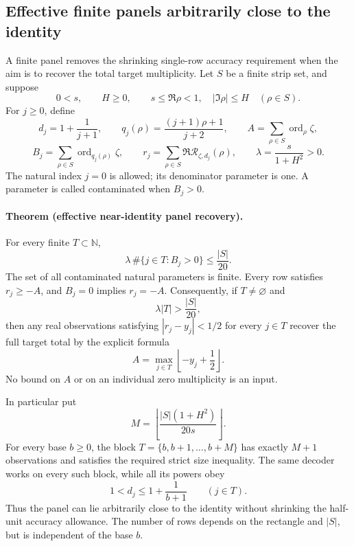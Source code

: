 \subsection{Effective finite panels arbitrarily close to the identity}
\label{sec:near-identity-panel}

A finite panel removes the shrinking single-row accuracy requirement when
the aim is to recover the total target multiplicity. Let \(S\) be a finite
strip set, and suppose
\[
 0<s,\qquad H\ge0,\qquad
 s\le\Re\rho<1,\quad |\Im\rho|\le H\quad(\rho\in S).
\]
For \(j\ge0\), define
\[
 d_j=1+\frac1{j+1},\qquad
 q_j(\rho)=\frac{(j+1)\rho+1}{j+2},\qquad
 A=\sum_{\rho\in S}\operatorname{ord}_\rho\zeta,
\]
\[
 B_j=\sum_{\rho\in S}\operatorname{ord}_{q_j(\rho)}\zeta,\qquad
 r_j=\sum_{\rho\in S}\Re\mathcal R_{\zeta,d_j}(\rho),\qquad
 \lambda=\frac{s}{1+H^2}>0.
\]
The natural index \(j=0\) is allowed; its denominator parameter is one.
A parameter is called contaminated when \(B_j>0\).

\paragraph{Theorem (effective near-identity panel recovery).}
For every finite \(T\subset\mathbb N\),
\begin{equation}\label{eq:near-identity-bad-budget}
 \lambda\,\#\{j\in T:B_j>0\}\le\frac{|S|}{20}.
\end{equation}
The set of all contaminated natural parameters is finite.
Every row satisfies \(r_j\ge-A\), and \(B_j=0\) implies \(r_j=-A\).
Consequently, if \(T\ne\varnothing\) and
\[
 \lambda |T|>\frac{|S|}{20},
\]
then any real observations satisfying \(|r_j-y_j|<1/2\) for every \(j\in T\)
recover the full target total by the explicit formula
\begin{equation}\label{eq:near-identity-panel-decode}
 A=\max_{j\in T}\left\lfloor-y_j+\frac12\right\rfloor.
\end{equation}
No bound on \(A\) or on an individual zero multiplicity is an input.

In particular put
\[
 M=\left\lfloor\frac{|S|(1+H^2)}{20s}\right\rfloor.
\]
For every base \(b\ge0\), the block \(T=\{b,b+1,\ldots,b+M\}\) has
exactly \(M+1\) observations and satisfies the required strict size inequality.
The same decoder works on every such block, while all its powers obey
\[
 1<d_j\le1+\frac1{b+1}\qquad(j\in T).
\]
Thus the panel can lie arbitrarily close to the identity without shrinking
the half-unit accuracy allowance. The number of rows depends on the
rectangle and \(|S|\), but is independent of the base \(b\).

